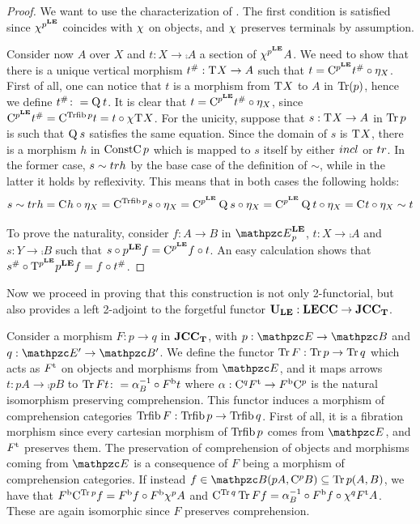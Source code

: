 \documentclass{lmcs} %
\theoremstyle{plain}\newtheorem{satz}[thm]{Satz} %
\begin{document}
			\begin{proof}
				We want to use the characterization of . The first condition is satisfied since $\chi^{{p}^{\mathbf{LE}}}$ coincides with $\chi^{}$ on objects, and $\chi^{}$ preserves terminals by assumption.
				
				Consider now $A$ over $X$ and $t:X\to\comp{}A$ a section of $\chi^{{p}^{\mathbf{LE}}}A$. We need to show that there is a unique vertical morphism $t^{\#}:\mathrm{T}^{}X\to A$ such that $t=\mathrm{C}^{{p}^{\mathbf{LE}}}t^{\#}\circ \eta_X$. First of all, one can notice that $t$ is a morphism from $\mathrm{T}^{}X$ to $A$ in $\mathop{\mathrm{Tr}}\nolimits(p)$, hence we define $t^{\#}\colon= \mathop{\mathrm{Q}}\nolimits^{} t$. It is clear that $t=\mathrm{C}^{{p}^{\mathbf{LE}}}t^{\#}\circ\eta_X$, since $\mathrm{C}^{{p}^{\mathbf{LE}}}t^{\#}=\mathrm{C}^{\mathop{\mathrm{Trfib}}\nolimits p}t=t\circ\chi^{}\mathrm{T}^{}X$. For the unicity, suppose that $s:\mathrm{T}^{}X\to A$ in $\mathop{\mathrm{Tr}}\nolimits{p}$ is such that $\mathop{\mathrm{Q}}\nolimits^{}s$ satisfies the same equation. Since the domain of $s$ is $\mathrm{T}^{}X$, there is a morphism $h$ in $\mathop{\mathrm{ConstC}}\nolimits{p}$ which is mapped to $s$ itself by either $incl$ or $tr$. In the former case, $s\sim tr h$ by the base case of the definition of $\sim$, while in the latter it holds by reflexivity. This means that in both cases the following holds:
				\[s\sim tr h=\mathrm{C}^{}h\circ\eta_X=\mathrm{C}^{\mathop{\mathrm{Trfib}}\nolimits p}s\circ\eta_X=\mathrm{C}^{{p}^{\mathbf{LE}}}\mathop{\mathrm{Q}}\nolimits^{}s\circ\eta_X=\mathrm{C}^{{p}^{\mathbf{LE}}}\mathop{\mathrm{Q}}\nolimits^{}t\circ\eta_X=\mathrm{C}^{}t\circ\eta_X\sim t\]
				
				To prove the naturality, consider $f:A\to B$ in $\LEDomE{p}$, $t:X\to\comp{}A$ and $s:Y\to\comp{}B$ such that $s\circ {p}^{\mathbf{LE}}f=\mathrm{C}^{{p}^{\mathbf{LE}}}f\circ t$. An easy calculation shows that $s^{\#}\circ \mathrm{T}^{{p}^{\mathbf{LE}}}{p}^{\mathbf{LE}}f=f\circ t^{\#}$.
			\end{proof}
			
			Now we proceed in proving that this construction is not only 2-functorial, but also provides a left 2-adjoint to the forgetful functor $\mathbf{U_{LE}}:\mathbf{LECC}\to\mathbf{JCC_T}$. 
			
			Consider a morphism $F:p\to q$ in $\mathbf{JCC_T}$, with $p:\ct{E}\to\ct{B}$ and $q:\ct{E'}\to\ct{B'}$. We define the functor $\mathop{\mathrm{Tr}}\nolimits{F}:\mathop{\mathrm{Tr}}\nolimits{p}\to\mathop{\mathrm{Tr}}\nolimits{q}$ which acts as ${F}^{\mathrm{t}}$ on objects and morphisms from $\ct{E}$, and it maps arrows $t:pA\to\comp{p}B$ to $\mathop{\mathrm{Tr}}\nolimits{F}t\colon = \alpha^{-1}_B\circ{F}^{\mathrm{b}}t$ where $\alpha:\mathrm{C}^{q}{F}^{\mathrm{t}}\to{F}^{\mathrm{b}}\mathrm{C}^{p}$ is the natural isomorphism preserving comprehension. This functor induces a morphism of comprehension categories $\mathop{\mathrm{Trfib}}\nolimits F:\mathop{\mathrm{Trfib}}\nolimits p\to\mathop{\mathrm{Trfib}}\nolimits q$. First of all, it is a fibration morphism since every cartesian morphism of $\mathop{\mathrm{Trfib}}\nolimits p$ comes from $\ct{E}$, and ${F}^{\mathrm{t}}$ preserves them.
			The preservation of comprehension of objects and morphisms coming from $\ct{E}$ is a consequence of $F$ being a morphism of comprehension categories. If instead $f\in\Hom{\ct{B}}(pA,\comp{p}B)\subseteq\Hom{\Tr{p}}(A,B)$, we have that ${F}^{\mathrm{b}}\mathrm{C}^{\mathop{\mathrm{Tr}}\nolimits{p}}f={F}^{\mathrm{b}}f\circ {F}^{\mathrm{b}}\chi^{p}A$ and $\mathrm{C}^{\mathop{\mathrm{Tr}}\nolimits{q}}\mathop{\mathrm{Tr}}\nolimits{F}f=\alpha^{-1}_B\circ {F}^{\mathrm{b}}f\circ \chi^{q}{F}^{\mathrm{t}}A$. These are again isomorphic since $F$ preserves comprehension.
			
\end{document}
